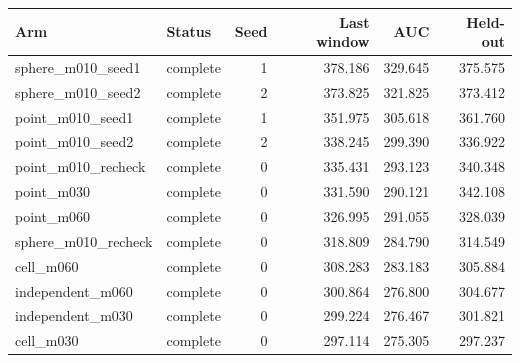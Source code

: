 \begin{tabular}{llrrrr}
Arm & Status & Seed & Last window & AUC & Held-out \\
\hline
sphere\_m010\_seed1 & complete & 1 & 378.186 & 329.645 & 375.575 \\
sphere\_m010\_seed2 & complete & 2 & 373.825 & 321.825 & 373.412 \\
point\_m010\_seed1 & complete & 1 & 351.975 & 305.618 & 361.760 \\
point\_m010\_seed2 & complete & 2 & 338.245 & 299.390 & 336.922 \\
point\_m010\_recheck & complete & 0 & 335.431 & 293.123 & 340.348 \\
point\_m030 & complete & 0 & 331.590 & 290.121 & 342.108 \\
point\_m060 & complete & 0 & 326.995 & 291.055 & 328.039 \\
sphere\_m010\_recheck & complete & 0 & 318.809 & 284.790 & 314.549 \\
cell\_m060 & complete & 0 & 308.283 & 283.183 & 305.884 \\
independent\_m060 & complete & 0 & 300.864 & 276.800 & 304.677 \\
independent\_m030 & complete & 0 & 299.224 & 276.467 & 301.821 \\
cell\_m030 & complete & 0 & 297.114 & 275.305 & 297.237 \\
\end{tabular}

